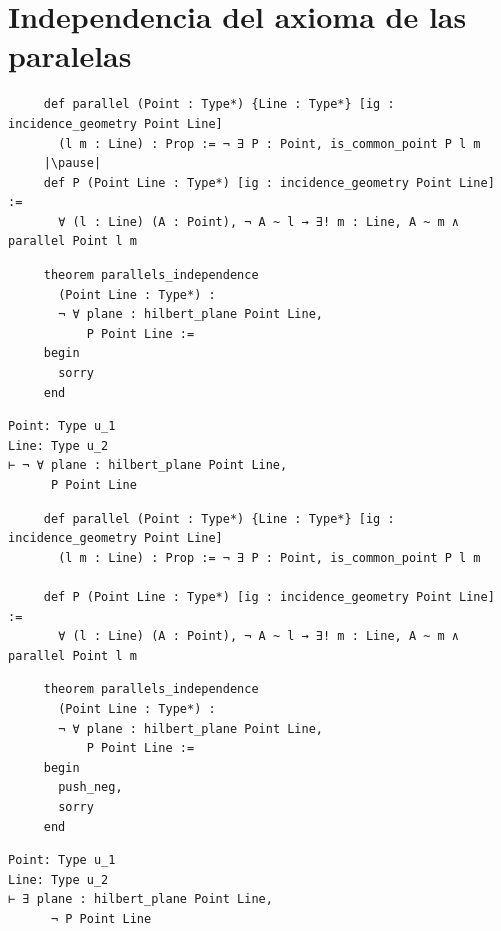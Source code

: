 \documentclass[t, aspectratio=169]{beamer}
\begin{document}
\section{Independencia del axioma de las paralelas}
\begin{frame}[fragile]
	\begin{lstlisting}
     def parallel (Point : Type*) {Line : Type*} [ig : incidence_geometry Point Line] 
       (l m : Line) : Prop := ¬ ∃ P : Point, is_common_point P l m
     |\pause|
     def P (Point Line : Type*) [ig : incidence_geometry Point Line] := 
       ∀ (l : Line) (A : Point), ¬ A ~ l → ∃! m : Line, A ~ m ∧ parallel Point l m
    \end{lstlisting}
	\pause
	\begin{multicols}{2}
		\begin{lstlisting}
     theorem parallels_independence 
       (Point Line : Type*) : 
       ¬ ∀ plane : hilbert_plane Point Line, 
           P Point Line := 
     begin
       sorry
     end
        \end{lstlisting}
		\columnbreak
		\pause
		\begin{lstlisting}
Point: Type u_1
Line: Type u_2
⊢ ¬ ∀ plane : hilbert_plane Point Line, 
      P Point Line
        \end{lstlisting}
	\end{multicols}
\end{frame}

\begin{frame}[fragile]
	\begin{lstlisting}
     def parallel (Point : Type*) {Line : Type*} [ig : incidence_geometry Point Line] 
       (l m : Line) : Prop := ¬ ∃ P : Point, is_common_point P l m

     def P (Point Line : Type*) [ig : incidence_geometry Point Line] := 
       ∀ (l : Line) (A : Point), ¬ A ~ l → ∃! m : Line, A ~ m ∧ parallel Point l m
    \end{lstlisting}

	\begin{multicols}{2}
		\begin{lstlisting}
     theorem parallels_independence 
       (Point Line : Type*) : 
       ¬ ∀ plane : hilbert_plane Point Line, 
           P Point Line := 
     begin
       push_neg, 
       sorry
     end
        \end{lstlisting}
		\columnbreak

		\begin{lstlisting}
Point: Type u_1
Line: Type u_2
⊢ ∃ plane : hilbert_plane Point Line, 
      ¬ P Point Line
        \end{lstlisting}
	\end{multicols}
\end{frame}
\end{document}

